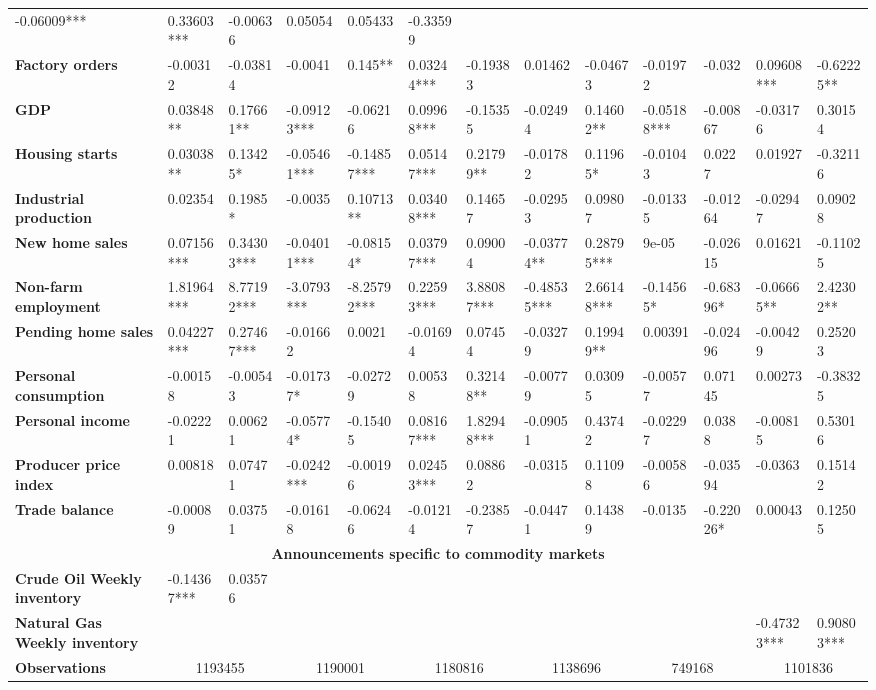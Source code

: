 \begin{sidewaystable}
{\begin{tabular}{@{}lllllllllllll@{}}
-0.06009*** & 0.33603*** & -0.00636 & 0.05054 & 0.05433 & -0.33599 \\ \textbf{Factory orders}& -0.00312 & -0.03814 & -0.0041 & 0.145** & 0.03244***& -0.19383 & 0.01462 & -0.04673 & -0.01972 & -0.032 & 0.09608*** & -0.62225** \\ \textbf{GDP}& 0.03848** & 0.17661** & -0.09123*** & -0.06216 & 0.09968***& -0.15355 & -0.02494 & 0.14602** & -0.05188*** & -0.00867 & -0.03176 & 0.30154 \\ \textbf{Housing starts}& 0.03038** & 0.13425* & -0.05461*** & -0.14857*** & 0.05147***& 0.21799**& -0.01782 & 0.11965* & -0.01043 & 0.0227 & 0.01927 & -0.32116 \\ \textbf{Industrial production}& 0.02354 & 0.1985* & -0.0035 & 0.10713** & 0.03408***& 0.14657 & -0.02953 & 0.09807 & -0.01335 & -0.01264 & -0.02947 & 0.09028 \\ \textbf{New home sales}& 0.07156*** & 0.34303*** & -0.04011*** & -0.08154* & 0.03797***& 0.09004 & -0.03774** & 0.28795*** & 9e-05 & -0.02615 & 0.01621 & -0.11025 \\ \textbf{Non-farm employment}& 1.81964*** & 8.77192*** & -3.0793*** & -8.25792*** & 0.22593***& 3.88087***& -0.48535*** & 2.66148*** & -0.14565* & -0.68396* & -0.06665** & 2.42302** \\ \textbf{Pending home sales}& 0.04227*** & 0.27467*** & -0.01662 & 0.0021 & -0.01694 & 0.07454 & -0.03279 & 0.19949** & 0.00391 & -0.02496 & -0.00429 & 0.25203 \\ \textbf{Personal consumption}& -0.00158 & -0.00543 & -0.01737* & -0.02729 & 0.00538 & 0.32148** & -0.00779 & 0.03095 & -0.00577 & 0.07145 & 0.00273 & -0.38325 \\ \textbf{Personal income}& -0.02221 & 0.00621 & -0.05774* & -0.15405 & 0.08167***& 1.82948***& -0.09051 & 0.43742 & -0.02297 & 0.0388 & -0.00815 & 0.53016 \\ \textbf{Producer price index}& 0.00818 & 0.07471 & -0.0242*** & -0.00196 & 0.02453***& 0.08862 & -0.0315 & 0.11098 & -0.00586 & -0.03594 & -0.0363 & 0.15142 \\ \textbf{Trade balance}& -0.00089 & 0.03751 & -0.01618 & -0.06246 & -0.01214 & -0.23857 & -0.04471 & 0.14389 & -0.0135 & -0.22026* & 0.00043 & 0.12505 \\  \midrule \multicolumn{13}{c}{\textbf{Announcements specific to commodity markets}} \\ \midrule \textbf{Crude Oil Weekly inventory}& -0.14367*** & 0.03576 &  &  &  &  &  &  &  &  &  &  \\ \textbf{Natural Gas Weekly inventory}&  &  &  &  &  &  &  &  &  &  & -0.47323*** & 0.90803*** \\  \midrule \textbf{Observations}             &\multicolumn{2}{c}{ 1193455 }                                                 & \multicolumn{2}{c}{ 1190001 }                                                 & \multicolumn{2}{c}{ 1180816 }                                                 & \multicolumn{2}{c}{ 1138696 }                                                 & \multicolumn{2}{c}{ 749168 }                                                   & \multicolumn{2}{c}{ 1101836 }                
\end{tabular}}
\end{sidewaystable}
